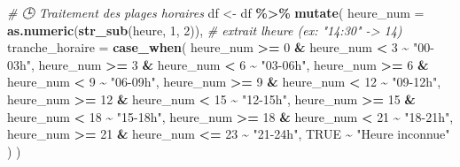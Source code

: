 \documentclass[
]{article}
\newenvironment{Shaded}{\begin{snugshade}}{\end{snugshade}}
\newcommand{\AttributeTok}[1]{\textcolor[rgb]{0.13,0.29,0.53}{#1}}
\newcommand{\CommentTok}[1]{\textcolor[rgb]{0.56,0.35,0.01}{\textit{#1}}}
\newcommand{\ConstantTok}[1]{\textcolor[rgb]{0.56,0.35,0.01}{#1}}
\newcommand{\DecValTok}[1]{\textcolor[rgb]{0.00,0.00,0.81}{#1}}
\newcommand{\FunctionTok}[1]{\textcolor[rgb]{0.13,0.29,0.53}{\textbf{#1}}}
\newcommand{\NormalTok}[1]{#1}
\newcommand{\OtherTok}[1]{\textcolor[rgb]{0.56,0.35,0.01}{#1}}
\newcommand{\SpecialCharTok}[1]{\textcolor[rgb]{0.81,0.36,0.00}{\textbf{#1}}}
\newcommand{\StringTok}[1]{\textcolor[rgb]{0.31,0.60,0.02}{#1}}
\begin{document}
\begin{Shaded}
\begin{Highlighting}[]
\CommentTok{\# 🕒 Traitement des plages horaires}
\NormalTok{df }\OtherTok{\textless{}{-}}\NormalTok{ df }\SpecialCharTok{\%\textgreater{}\%}
  \FunctionTok{mutate}\NormalTok{(}
    \AttributeTok{heure\_num =} \FunctionTok{as.numeric}\NormalTok{(}\FunctionTok{str\_sub}\NormalTok{(heure, }\DecValTok{1}\NormalTok{, }\DecValTok{2}\NormalTok{)),  }\CommentTok{\# extrait l\textquotesingle{}heure (ex: "14:30" {-}\textgreater{} 14)}
    \AttributeTok{tranche\_horaire =} \FunctionTok{case\_when}\NormalTok{(}
\NormalTok{      heure\_num }\SpecialCharTok{\textgreater{}=} \DecValTok{0} \SpecialCharTok{\&}\NormalTok{ heure\_num }\SpecialCharTok{\textless{}} \DecValTok{3} \SpecialCharTok{\textasciitilde{}} \StringTok{"00{-}03h"}\NormalTok{,}
\NormalTok{      heure\_num }\SpecialCharTok{\textgreater{}=} \DecValTok{3} \SpecialCharTok{\&}\NormalTok{ heure\_num }\SpecialCharTok{\textless{}} \DecValTok{6} \SpecialCharTok{\textasciitilde{}} \StringTok{"03{-}06h"}\NormalTok{,}
\NormalTok{      heure\_num }\SpecialCharTok{\textgreater{}=} \DecValTok{6} \SpecialCharTok{\&}\NormalTok{ heure\_num }\SpecialCharTok{\textless{}} \DecValTok{9} \SpecialCharTok{\textasciitilde{}} \StringTok{"06{-}09h"}\NormalTok{,}
\NormalTok{      heure\_num }\SpecialCharTok{\textgreater{}=} \DecValTok{9} \SpecialCharTok{\&}\NormalTok{ heure\_num }\SpecialCharTok{\textless{}} \DecValTok{12} \SpecialCharTok{\textasciitilde{}} \StringTok{"09{-}12h"}\NormalTok{,}
\NormalTok{      heure\_num }\SpecialCharTok{\textgreater{}=} \DecValTok{12} \SpecialCharTok{\&}\NormalTok{ heure\_num }\SpecialCharTok{\textless{}} \DecValTok{15} \SpecialCharTok{\textasciitilde{}} \StringTok{"12{-}15h"}\NormalTok{,}
\NormalTok{      heure\_num }\SpecialCharTok{\textgreater{}=} \DecValTok{15} \SpecialCharTok{\&}\NormalTok{ heure\_num }\SpecialCharTok{\textless{}} \DecValTok{18} \SpecialCharTok{\textasciitilde{}} \StringTok{"15{-}18h"}\NormalTok{,}
\NormalTok{      heure\_num }\SpecialCharTok{\textgreater{}=} \DecValTok{18} \SpecialCharTok{\&}\NormalTok{ heure\_num }\SpecialCharTok{\textless{}} \DecValTok{21} \SpecialCharTok{\textasciitilde{}} \StringTok{"18{-}21h"}\NormalTok{,}
\NormalTok{      heure\_num }\SpecialCharTok{\textgreater{}=} \DecValTok{21} \SpecialCharTok{\&}\NormalTok{ heure\_num }\SpecialCharTok{\textless{}=} \DecValTok{23} \SpecialCharTok{\textasciitilde{}} \StringTok{"21{-}24h"}\NormalTok{,}
      \ConstantTok{TRUE} \SpecialCharTok{\textasciitilde{}} \StringTok{"Heure inconnue"}
\NormalTok{    )}
\NormalTok{  )}


\end{Highlighting}
\end{Shaded}
\end{document}
